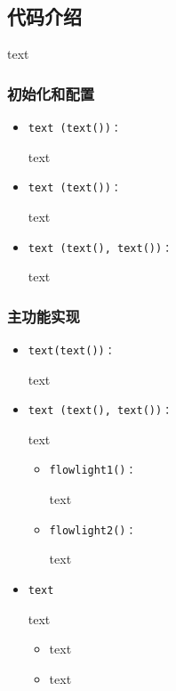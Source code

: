 \subsection{代码介绍}
text
\subsubsection{初始化和配置}
\begin{itemize}
    \item \begin{verbatim}text (text())：\end{verbatim}text
    \item \begin{verbatim}text (text())：\end{verbatim}text
    \item \begin{verbatim}text (text(), text())：\end{verbatim}text
\end{itemize}



\subsubsection{主功能实现}
\begin{itemize}
    \item \begin{verbatim}text(text())：\end{verbatim}text
    \item \begin{verbatim}text (text(), text())：\end{verbatim}text
          \begin{itemize}
              \item \begin{verbatim}flowlight1()：\end{verbatim}text
              \item \begin{verbatim}flowlight2()：\end{verbatim}text
          \end{itemize}
    \item \begin{verbatim}text\end{verbatim}
          text
          \begin{itemize}
              \item text
              \item text
          \end{itemize}

\end{itemize}


